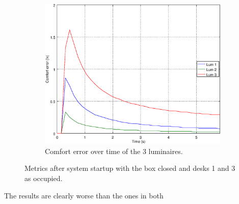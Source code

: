 \begin{figure}[ht]
\begin{subfigure}[t]{0.32\textwidth}
    \centering
    \includegraphics[width=.95\textwidth]{img/n_closed_o101}
    \caption{Comfort error over time of the 3 luminaires.}
    \label{fig:n_closed_o101}
    \end{subfigure}
    \caption{Metrics after system startup with the box closed and desks 1 and 3 as occupied. }
    \label{fig:closed_o101}
\end{figure}

The results are clearly worse than the ones in both

